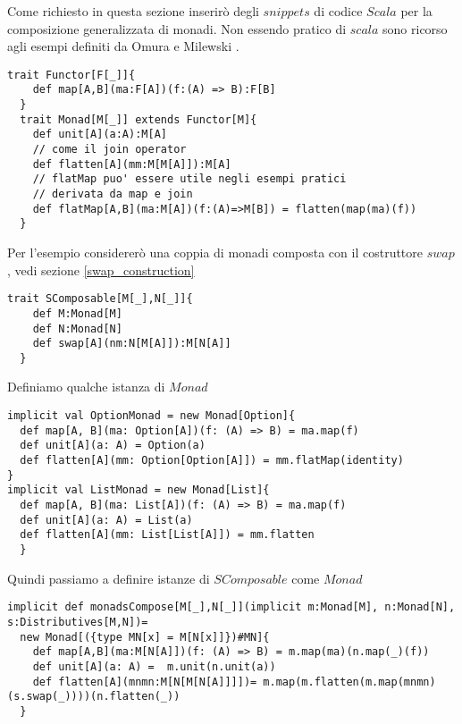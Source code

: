 Come richiesto in questa sezione inserirò degli $snippets$ di codice $Scala$
per la composizione generalizzata di monadi.
Non essendo pratico di $scala$ sono ricorso agli esempi definiti da Omura \cite{omura0}
e Milewski \cite{milewski0}.

\begin{lstlisting}[style=myScalastyle, caption=Functor and Monad Traits]
  trait Functor[F[_]]{
    def map[A,B](ma:F[A])(f:(A) => B):F[B]
  }
  trait Monad[M[_]] extends Functor[M]{
    def unit[A](a:A):M[A]
    // come il join operator
    def flatten[A](mm:M[M[A]]):M[A]
    // flatMap puo' essere utile negli esempi pratici
    // derivata da map e join
    def flatMap[A,B](ma:M[A])(f:(A)=>M[B]) = flatten(map(ma)(f))
  }
\end{lstlisting}

Per l'esempio considererò una coppia di monadi composta con il costruttore $swap$,
vedi sezione \ref{swap_construction}

\begin{lstlisting}[style=myScalastyle, caption=Swap Constructor]
  trait SComposable[M[_],N[_]]{
    def M:Monad[M]
    def N:Monad[N]
    def swap[A](nm:N[M[A]]):M[N[A]]
  }
\end{lstlisting}

Definiamo qualche istanza di $Monad$

\begin{lstlisting}[style=myScalastyle, caption=Type class instances]
implicit val OptionMonad = new Monad[Option]{
  def map[A, B](ma: Option[A])(f: (A) => B) = ma.map(f)
  def unit[A](a: A) = Option(a)
  def flatten[A](mm: Option[Option[A]]) = mm.flatMap(identity)
}
implicit val ListMonad = new Monad[List]{
  def map[A, B](ma: List[A])(f: (A) => B) = ma.map(f)
  def unit[A](a: A) = List(a)
  def flatten[A](mm: List[List[A]]) = mm.flatten
  }
\end{lstlisting}
\pagebreak
Quindi passiamo a definire istanze di $SComposable$ come $Monad$

\begin{lstlisting}[style=myScalastyle, caption=SComposable is Monad]
implicit def monadsCompose[M[_],N[_]](implicit m:Monad[M], n:Monad[N], s:Distributives[M,N])=
  new Monad[({type MN[x] = M[N[x]]})#MN]{
    def map[A,B](ma:M[N[A]])(f: (A) => B) = m.map(ma)(n.map(_)(f))
    def unit[A](a: A) =  m.unit(n.unit(a))
    def flatten[A](mnmn:M[N[M[N[A]]]])= m.map(m.flatten(m.map(mnmn)(s.swap(_))))(n.flatten(_))
  }
\end{lstlisting}

